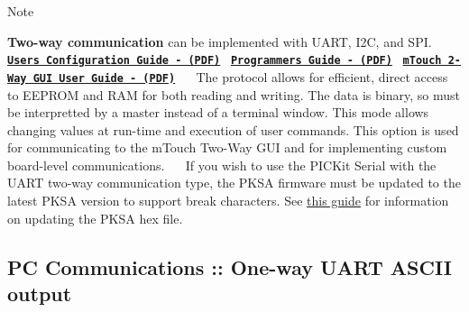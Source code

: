 \begin{DoxyItemize}
\begin{DoxyNote}{Note}
\end{DoxyNote}
\item {\bfseries Two-\/way communication} can be implemented with U\+A\+R\+T, I2\+C, and S\+P\+I. ~\newline
~\newline
 \href{../mComm Users Guide.pdf}{\tt {\bfseries User\textquotesingle{}s Configuration Guide -\/ (P\+D\+F)}}~\newline
 \href{../mComm Programmers Guide.pdf}{\tt {\bfseries Programmer\textquotesingle{}s Guide -\/ (P\+D\+F)}}~\newline
 \href{../mTouch 2-Way GUI User Guide.pdf}{\tt {\bfseries m\+Touch 2-\/\+Way G\+U\+I User Guide -\/ (P\+D\+F)}}~\newline
~\newline
 The protocol allows for efficient, direct access to E\+E\+P\+R\+O\+M and R\+A\+M for both reading and writing. The data is binary, so must be interpretted by a master instead of a terminal window. This mode allows changing values at run-\/time and execution of user commands. This option is used for communicating to the m\+Touch Two-\/\+Way G\+U\+I and for implementing custom board-\/level communications.~\newline
~\newline
 If you wish to use the P\+I\+C\+Kit Serial with the U\+A\+R\+T two-\/way communication type, the P\+K\+S\+A firmware must be updated to the latest P\+K\+S\+A version to support break characters. See \hyperlink{PKSARS232}{this guide} for information on updating the P\+K\+S\+A hex file.~\newline
~\newline
 \end{DoxyItemize}
\hypertarget{ts-Comms-1way}{}\subsection{P\+C Communications \+:\+: One-\/way U\+A\+R\+T A\+S\+C\+I\+I output}\label{ts-Comms-1way}

